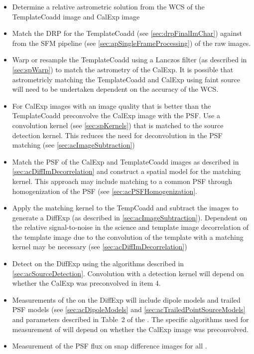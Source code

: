 \begin{itemize}
\item Determine a relative astrometric solution from the WCS of the TemplateCoadd image and CalExp image
\item Match the DRP \Sources for the TemplateCoadd (see \ref{sec:drpFinalImChar}) against \Sources from the SFM pipeline (see \ref{sec:apSingleFrameProcessing}) of the raw images.
\item Warp or resample the TemplateCoadd using a Lanczos filter  (as described in \ref{sec:spWarp}) to match the astrometry of the CalExp. It is possible that astrometricly matching the TemplateCoadd and CalExp using faint source will need to be undertaken dependent on the accuracy of the WCS.
\item For CalExp images with an image quality that is better than the TemplateCoadd preconvolve the CalExp image with the PSF. Use a  convolution kernel (see \ref{sec:spKernels}) that is matched to the source detection kernel. This reduces the need for deconvolution in the PSF matching (see \ref{sec:acImageSubtraction})
\item Match the PSF of the CalExp and TemplateCoadd images as described in \ref{sec:acDiffImDecorrelation} and construct a spatial model for the matching kernel. This approach may include matching to a common PSF through homogenization of the PSF (see \ref{sec:acPSFHomogenization}.
\item Apply the matching kernel to the TempCoadd and subtract the images to generate a DiffExp (as described in \ref{sec:acImageSubtraction}). Dependent on the relative signal-to-noise in the science and template image decorrelation of the template image due to the convolution of the template with a matching kernel may be necessary (see \ref{sec:acDiffImDecorrelation})
\item Detect \DIASources on the DiffExp using the algorithms described in \ref{sec:acSourceDetection}. Convolution with a detection kernel will depend on whether the CalExp was preconvolved in item 4.
\item Measurements of the \DIASources on the DiffExp will include dipole models and trailed PSF models (see  \ref{sec:acDipoleModels} and \ref{sec:acTrailedPointSourceModels} and parameters described in Table~2 of the \DPDD . The specific algorithms used for measurement of \DIASources will depend on whether the CalExp image was preconvolved.
\item Measurement of the PSF flux on snap difference images for all \DIASources.

\end{itemize}
